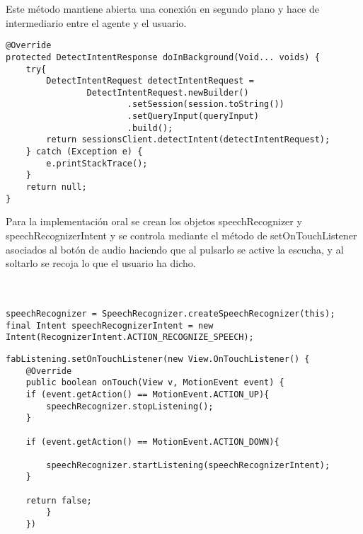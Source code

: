 \documentclass[11pt,a4paper]{article}
\begin{document}
Este método mantiene abierta una conexión en segundo plano y hace de intermediario entre el agente y el usuario.\\

\begin{lstlisting}
@Override
protected DetectIntentResponse doInBackground(Void... voids) {
    try{
        DetectIntentRequest detectIntentRequest =
                DetectIntentRequest.newBuilder()
                        .setSession(session.toString())
                        .setQueryInput(queryInput)
                        .build();
        return sessionsClient.detectIntent(detectIntentRequest);
    } catch (Exception e) {
        e.printStackTrace();
    }
    return null;
}
\end{lstlisting}

Para la implementación oral se crean los objetos speechRecognizer y speechRecognizerIntent y se controla mediante el método de setOnTouchListener asociados al botón de audio haciendo que al pulsarlo se active la escucha, y al soltarlo se recoja lo que el usuario ha dicho.\\\\\\

\begin{lstlisting}
speechRecognizer = SpeechRecognizer.createSpeechRecognizer(this);
final Intent speechRecognizerIntent = new Intent(RecognizerIntent.ACTION_RECOGNIZE_SPEECH);
\end{lstlisting}

\begin{lstlisting}
fabListening.setOnTouchListener(new View.OnTouchListener() {
    @Override
    public boolean onTouch(View v, MotionEvent event) {
    if (event.getAction() == MotionEvent.ACTION_UP){
        speechRecognizer.stopListening();
    }

    if (event.getAction() == MotionEvent.ACTION_DOWN){

        speechRecognizer.startListening(speechRecognizerIntent);
    }

    return false;
        }
    })
\end{lstlisting}

\newpage
\end{document}
